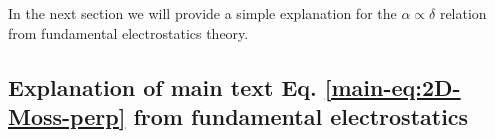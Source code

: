\documentclass[manuscript=suppinfo,email=true,hyperref=true,keywords=false]{achemso}
\begin{document}
In the next section we will
provide a simple explanation for the $\alpha \propto \delta$ relation
from fundamental electrostatics theory.

\subsection{Explanation of main text Eq. \ref{main-eq:2D-Moss-perp}
  from fundamental electrostatics}
\label{ssec:theory-1-perp-fundamental}
\end{document}
